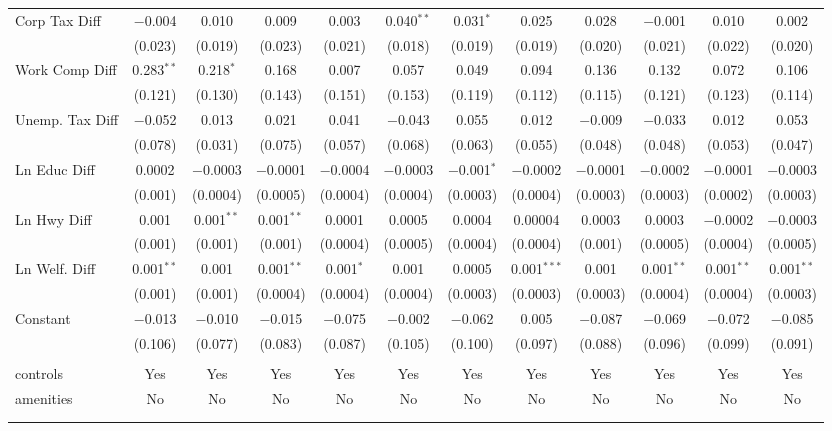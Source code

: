 \begin{table}[!htbp]
\begin{tabular}{@{\extracolsep{5pt}}lccccccccccc}
  Corp Tax Diff & $-$0.004 & 0.010 & 0.009 & 0.003 & 0.040$^{**}$ & 0.031$^{*}$ & 0.025 & 0.028 & $-$0.001 & 0.010 & 0.002 \\ 
  & (0.023) & (0.019) & (0.023) & (0.021) & (0.018) & (0.019) & (0.019) & (0.020) & (0.021) & (0.022) & (0.020) \\ 
  Work Comp Diff & 0.283$^{**}$ & 0.218$^{*}$ & 0.168 & 0.007 & 0.057 & 0.049 & 0.094 & 0.136 & 0.132 & 0.072 & 0.106 \\ 
  & (0.121) & (0.130) & (0.143) & (0.151) & (0.153) & (0.119) & (0.112) & (0.115) & (0.121) & (0.123) & (0.114) \\ 
  Unemp. Tax Diff & $-$0.052 & 0.013 & 0.021 & 0.041 & $-$0.043 & 0.055 & 0.012 & $-$0.009 & $-$0.033 & 0.012 & 0.053 \\ 
  & (0.078) & (0.031) & (0.075) & (0.057) & (0.068) & (0.063) & (0.055) & (0.048) & (0.048) & (0.053) & (0.047) \\ 
  Ln Educ Diff & 0.0002 & $-$0.0003 & $-$0.0001 & $-$0.0004 & $-$0.0003 & $-$0.001$^{*}$ & $-$0.0002 & $-$0.0001 & $-$0.0002 & $-$0.0001 & $-$0.0003 \\ 
  & (0.001) & (0.0004) & (0.0005) & (0.0004) & (0.0004) & (0.0003) & (0.0004) & (0.0003) & (0.0003) & (0.0002) & (0.0003) \\ 
  Ln Hwy Diff & 0.001 & 0.001$^{**}$ & 0.001$^{**}$ & 0.0001 & 0.0005 & 0.0004 & 0.00004 & 0.0003 & 0.0003 & $-$0.0002 & $-$0.0003 \\ 
  & (0.001) & (0.001) & (0.001) & (0.0004) & (0.0005) & (0.0004) & (0.0004) & (0.001) & (0.0005) & (0.0004) & (0.0005) \\ 
  Ln Welf. Diff & 0.001$^{**}$ & 0.001 & 0.001$^{**}$ & 0.001$^{*}$ & 0.001 & 0.0005 & 0.001$^{***}$ & 0.001 & 0.001$^{**}$ & 0.001$^{**}$ & 0.001$^{**}$ \\ 
  & (0.001) & (0.001) & (0.0004) & (0.0004) & (0.0004) & (0.0003) & (0.0003) & (0.0003) & (0.0004) & (0.0004) & (0.0003) \\ 
  Constant & $-$0.013 & $-$0.010 & $-$0.015 & $-$0.075 & $-$0.002 & $-$0.062 & 0.005 & $-$0.087 & $-$0.069 & $-$0.072 & $-$0.085 \\ 
  & (0.106) & (0.077) & (0.083) & (0.087) & (0.105) & (0.100) & (0.097) & (0.088) & (0.096) & (0.099) & (0.091) \\ 
 \hline \\[-1.8ex] 
controls & Yes & Yes & Yes & Yes & Yes & Yes & Yes & Yes & Yes & Yes & Yes \\ 
amenities & No & No & No & No & No & No & No & No & No & No & No \\ 
\hline \\[-1.8ex] 
\hline 
\hline \\[-1.8ex] 
\end{tabular} 
\end{table} 
